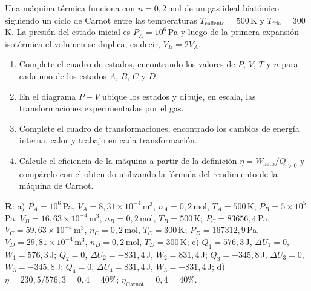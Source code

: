 \documentclass[a4paper,12pt]{article}
\begin{document}
\begin{enumerate}
		Una máquina térmica funciona con $n=0,2$\,mol de un gas ideal biatómico
		siguiendo un ciclo de Carnot entre las temperaturas
		$T_{\mathrm{caliente}}=500$\,K y $T_{\mathrm{fria}}=300$\,K. La presión
		del estado inicial es $P_A=10^6$\,Pa y luego de la primera expansión
		isotérmica el volumen se duplica, es decir, $V_B = 2 V_A$.
		\begin{enumerate}
			\item Complete el cuadro de estados, encontrando los valores de
				$P$, $V$, $T$ y $n$ para cada uno de los estados $A$, $B$, $C$
				y $D$. 
			\item En el diagrama $P-V$ ubique los estados y dibuje, en escala,
				las transformaciones experimentadas por el gas.
			\item Complete el cuadro de transformaciones, encontrado los
				cambios de energía interna, calor y trabajo en cada
				transformación.
			\item Calcule el eficiencia de la máquina a partir de la definición
				$\eta=W_{\mathrm{neto}} / Q_{>0}$ y compárelo con el obtenido
				utilizando la fórmula del rendimiento de la máquina de Carnot. 
		\end{enumerate}
		{\bf{R}}: a) 
		$P_A=10^6$\,Pa, $V_A=8,31\times10^{-4}$\,m$^3$, $n_A=0,2$\,mol, $T_A=500$\,K; $P_B=5\times 10^5$\,Pa, $V_B=16,63\times10^{-4}$\,m$^3$, $n_B=0,2$\,mol, $T_B=500$\,K; $P_C=83656,4$\,Pa, $V_C=59,63\times10^{-4}$\,m$^3$, $n_C=0,2$\,mol, $T_C=300$\,K; $P_D=167312,9$\,Pa, $V_D=29,81\times10^{-4}$\,m$^3$, $n_D=0,2$\,mol, $T_D=300$\,K; c) $Q_1=576,3$\,J, $\Delta U_1=0$, $W_1=576,3$\,J; $Q_2=0$, $\Delta U_2=-831,4$\,J, $W_2=831,4$\,J; $Q_3=-345,8$\,J, $\Delta U_3=0$, $W_3=-345,8$\,J; $Q_4=0$, $\Delta U_4=831,4$\,J, $W_3=-831,4$\,J; d) $\eta=230,5/576,3 = 0,4 = 40\%$; $\eta_{\mathrm{Carnot}} = 0,4 = 40\%$.
\end{enumerate}
\end{document}
